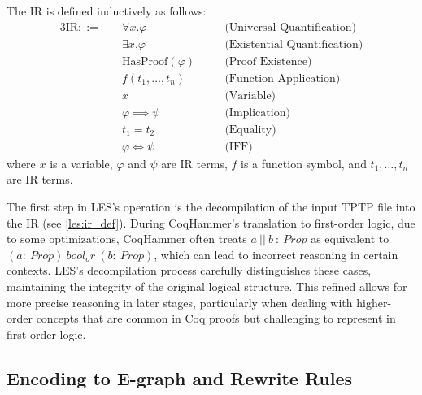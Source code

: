 \begin{definition}
\label{les:ir_def}
The IR is defined inductively as follows:
\begin{alignat*}{3}
\text{IR} ::= \quad & \forall x. \varphi && \quad\text{(Universal Quantification)} \\
             & \exists x. \varphi && \quad\text{(Existential Quantification)} \\
             & \text{HasProof}(\varphi) && \quad\text{(Proof Existence)} \\
             & f(t_1, \ldots, t_n) && \quad\text{(Function Application)} \\
             & x && \quad\text{(Variable)} \\
             & \varphi \implies \psi && \quad\text{(Implication)} \\
             & t_1 = t_2 && \quad\text{(Equality)} \\
             & \varphi \iff \psi && \quad\text{(IFF)}
\end{alignat*}
where $x$ is a variable, $\varphi$ and $\psi$ are IR terms, $f$ is a function symbol, and $t_1, \ldots, t_n$ are IR terms.
\end{definition}

The first step in LES's operation is the decompilation of the input TPTP file into the IR (see \autoref{les:ir_def}).
During CoqHammer's translation to first-order logic, due to some optimizations, CoqHammer often treats $a~||~b~:~Prop$ as equivalent to $(a:~Prop)~bool_or~(b:~Prop)$, which can lead to incorrect reasoning in certain contexts. 
LES's decompilation process carefully distinguishes these cases, maintaining the integrity of the original logical structure.
This refined allows for more precise reasoning in later stages, particularly when dealing with higher-order concepts that are common in Coq proofs but challenging to represent in first-order logic.

\subsection{Encoding to E-graph and Rewrite Rules}

